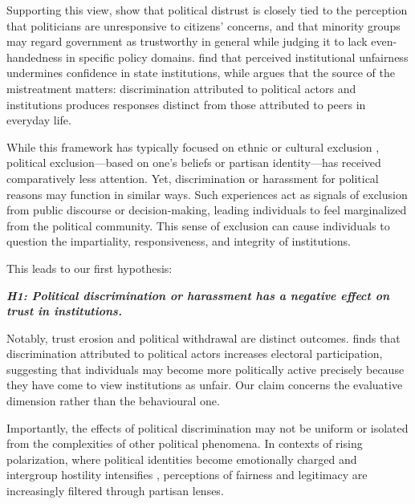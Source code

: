 \documentclass{article}
\begin{document}
Supporting this view, \textcite{levi_political_2000} show that political distrust is closely tied to the perception that politicians are unresponsive to citizens' concerns, and that minority groups may regard government as trustworthy in general while judging it to lack even-handedness in specific policy domains. \textcite{anderson_corruption_2003} find that perceived institutional unfairness undermines confidence in state institutions, while \textcite{oskooii_perceived_2020} argues that the source of the mistreatment matters: discrimination attributed to political actors and institutions produces responses distinct from those attributed to peers in everyday life.

While this framework has typically focused on ethnic or cultural exclusion \parencite{oskooii_perceived_2020, wilkes_immigration_2019, tyrberg_impact_2024}, political exclusion—based on one's beliefs or partisan identity—has received comparatively less attention. Yet, discrimination or harassment for political reasons may function in similar ways. Such experiences act as signals of exclusion from public discourse or decision-making, leading individuals to feel marginalized from the political community. This sense of exclusion can cause individuals to question the impartiality, responsiveness, and integrity of institutions.

This leads to our first hypothesis:

\emph{\textbf{\small
H1: Political discrimination or harassment has a negative effect on trust in institutions.
}}

Notably, trust erosion and political withdrawal are distinct outcomes. \textcite{oskooii_perceived_2020} finds that discrimination attributed to political actors increases electoral participation, suggesting that individuals may become more politically active precisely because they have come to view institutions as unfair. Our claim concerns the evaluative dimension rather than the behavioural one.

Importantly, the effects of political discrimination may not be uniform or isolated from the complexities of other political phenomena. In contexts of rising polarization, where political identities become emotionally charged and intergroup hostility intensifies \parencite{iyengar_origins_2019, mccoy_polarization_2018}, perceptions of fairness and legitimacy are increasingly filtered through partisan lenses.
\end{document}
